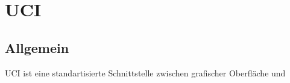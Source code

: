 \section{UCI}
\subsection{Allgemein}
UCI ist eine standartisierte Schnittstelle zwischen grafischer Oberfläche und 
\pagebreak